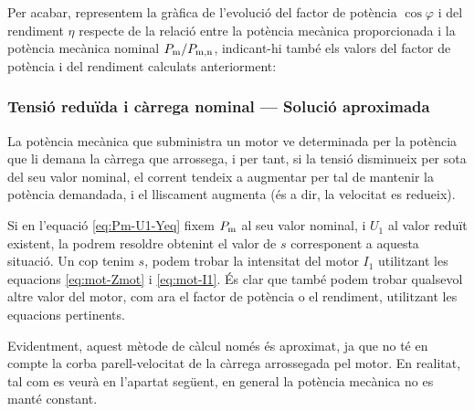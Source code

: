 \begin{exemple}
	Per acabar, representem  la gràfica de l'evolució del factor de potència $\cos\varphi$ i del rendiment $\eta$  respecte de la relació entre la potència mecànica proporcionada i la potència mecànica nominal $P_\mathrm{m}/P_\mathrm{m,n}$, indicant-hi també els valors del factor de potència i del rendiment calculats anteriorment:
	\begin{center}
		
	\end{center}

\end{exemple}
	
\subsubsection{Tensió reduïda i càrrega nominal --- Solució aproximada}

La potència mecànica que subministra un motor ve determinada per la potència que li demana la càrrega que arrossega, i per tant, si la tensió disminueix per sota del seu valor nominal, el corrent tendeix a augmentar per tal de mantenir la potència demandada, i el lliscament augmenta (és a dir, la velocitat es redueix).

Si en l'equació \eqref{eq:Pm-U1-Yeq} fixem $P_\mathrm{m}$ al seu valor nominal, i $U_1$ al valor reduït existent, la podrem resoldre obtenint el valor de $s$ corresponent  a aquesta situació. Un cop tenim $s$, podem trobar la intensitat del motor $I_1$ utilitzant les equacions \eqref{eq:mot-Zmot} i \eqref{eq:mot-I1}. És clar que també podem trobar qualsevol altre valor del motor, com  ara el factor de potència o el rendiment, utilitzant les equacions pertinents.

Evidentment, aquest mètode de càlcul només és aproximat, ja que no té en compte la corba parell-velocitat de la càrrega arrossegada pel motor. En realitat, tal com es veurà en l'apartat següent, en general la potència mecànica no es manté constant.

